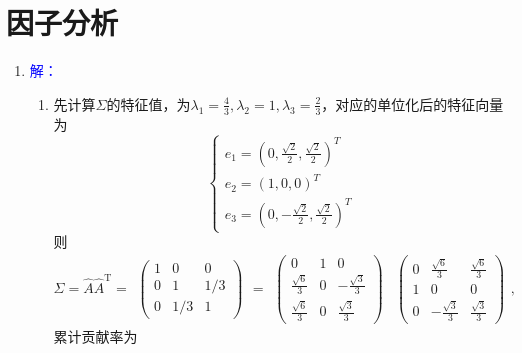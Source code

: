 \section{因子分析}
    \begin{enumerate}
        \item
        {\kaishu \textcolor{blue}{解：}}
        \begin{enumerate}[label=(\arabic*)]
            \item 先计算$\Sigma$的特征值，为$\displaystyle\lambda_1=\frac{4}{3},\lambda_2=1,\lambda_3=\frac{2}{3}$，对应的单位化后的特征向量为
            \[\begin{cases}
                \displaystyle e_1=\left(0,\frac{\sqrt{2}}{2},\frac{\sqrt{2}}{2}\right)^T\\
                e_2=(1,0,0)^T\\
                \displaystyle e_3=\left(0,-\frac{\sqrt{2}}{2},\frac{\sqrt{2}}{2}\right)^T
                \end{cases}\]
            则\[\Sigma=\hat{A}\hat{A}^{\mathrm{T}}=\begin{array}{ccc}\left(
                \begin{matrix}
                1 & 0 & 0\\
                0 & 1 & 1/3\\
                0 & 1/3 & 1
                \end{matrix}
                \right)\end{array}=\begin{array}{ccc}\left(
                \begin{matrix}
                0 & 1 & 0\\
                \frac{\sqrt{6}}{3} & 0 & -\frac{\sqrt{3}}{3}\\
                \frac{\sqrt{6}}{3} & 0 & \frac{\sqrt{3}}{3}
                \end{matrix}
                \right)\end{array}\begin{array}{ccc}\left(
                \begin{matrix}
                0 & \frac{\sqrt{6}}{3} & \frac{\sqrt{6}}{3}\\
                1 & 0 & 0\\
                0 & -\frac{\sqrt{3}}{3} & \frac{\sqrt{3}}{3}
                \end{matrix}
                \right)\end{array},\]
            累计贡献率为
            \begin{align*}

\end{align*}
\end{enumerate}
\end{enumerate}
